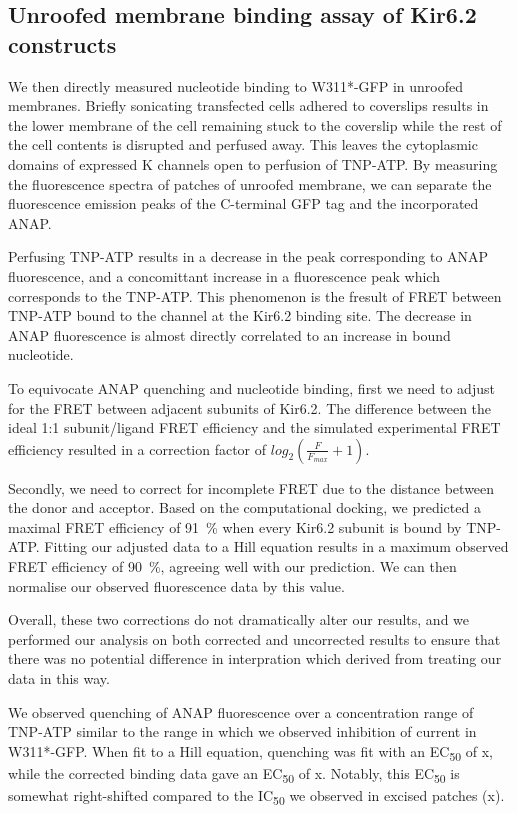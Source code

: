 \subsection{Unroofed membrane binding assay of Kir6.2 constructs}

We then directly measured nucleotide binding to W311*-GFP in unroofed membranes.
Briefly sonicating transfected cells adhered to coverslips results in the lower membrane of the cell remaining stuck to the coverslip while the rest of the cell contents is disrupted and perfused away.
This leaves the cytoplasmic domains of expressed K\ATP{} channels open to perfusion of TNP-ATP.
By measuring the fluorescence spectra of patches of unroofed membrane, we can separate the fluorescence emission peaks of the C-terminal GFP tag and the incorporated ANAP.

Perfusing TNP-ATP results in a decrease in the peak corresponding to ANAP fluorescence, and a concomittant increase in a fluorescence peak which corresponds to the TNP-ATP.
This phenomenon is the fresult of FRET between TNP-ATP bound to the channel at the Kir6.2 binding site.
The decrease in ANAP fluorescence is almost directly correlated to an increase in bound nucleotide.

To equivocate ANAP quenching and nucleotide binding, first we need to adjust for the FRET between adjacent subunits of Kir6.2.
The difference between the ideal 1:1 subunit/ligand FRET efficiency and the simulated experimental FRET efficiency resulted in a correction factor of $log_2(\frac{F}{F_{max}} + 1)$.

Secondly, we need to correct for incomplete FRET due to the distance between the donor and acceptor.
Based on the computational docking, we predicted a maximal FRET efficiency of \SI{91}{\percent} when every Kir6.2 subunit is bound by TNP-ATP.
Fitting our adjusted data to a Hill equation results in a maximum observed FRET efficiency of \SI{90}{\percent}, agreeing well with our prediction.
We can then normalise our observed fluorescence data by this value.

Overall, these two corrections do not dramatically alter our results, and we performed our analysis on both corrected and uncorrected results to ensure that there was no potential difference in interpration which derived from treating our data in this way.

We observed quenching of ANAP fluorescence over a concentration range of TNP-ATP similar to the range in which we observed inhibition of current in W311*-GFP.
When fit to a Hill equation, quenching was fit with an EC\textsubscript{50} of x, while the corrected binding data gave an EC\textsubscript{50} of x.
Notably, this EC\textsubscript{50} is somewhat right-shifted compared to the IC\textsubscript{50} we observed in excised patches (x).

